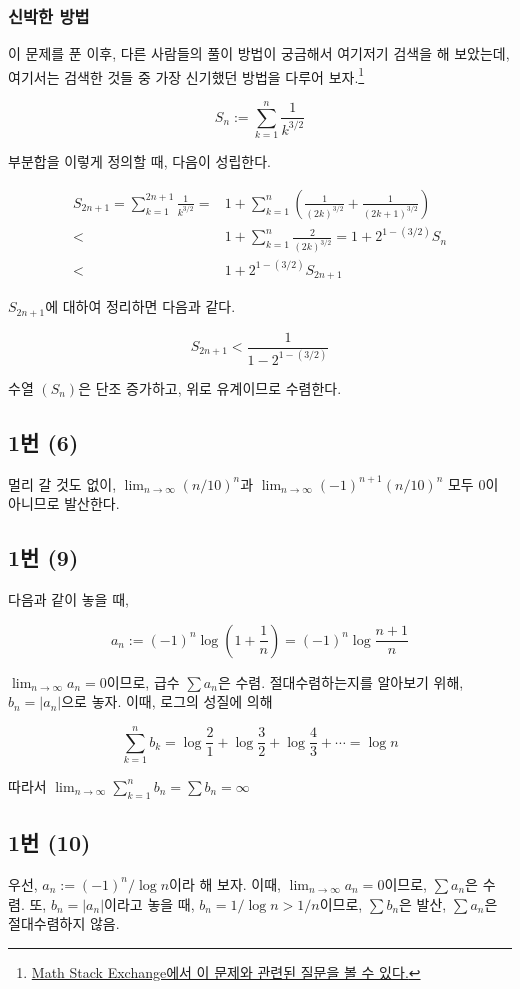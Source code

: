 \subsubsection{신박한 방법}

이 문제를 푼 이후, 다른 사람들의 풀이 방법이 궁금해서 여기저기 검색을 해 보았는데, 여기서는 검색한 것들 중 가장 신기했던 방법을 다루어 보자.\footnote{\href{https://math.stackexchange.com/questions/29450/self-contained-proof-that-sum-limits-n-1-infty-frac1np-converges-for}{Math Stack Exchange에서 이 문제와 관련된 질문을 볼 수 있다.}}

\[
S_n:=\sum^n_{k=1}\frac{1}{k^{3/2}}
\]

부분합을 이렇게 정의할 때, 다음이 성립한다.

\begin{align*}
S_{2n+1}=\sum^{2n+1}_{k=1}\frac{1}{k^{3/2}}=&1+\sum^n_{k=1}(\frac{1}{(2k)^{3/2}}+\frac{1}{(2k+1)^{3/2}})\\
<&1+\sum^n_{k=1}\frac{2}{(2k)^{3/2}}=1+2^{1-(3/2)}S_n\\
<&1+2^{1-(3/2)}S_{2n+1}
\end{align*}

$S_{2n+1}$에 대하여 정리하면 다음과 같다.

\[
S_{2n+1}<\frac{1}{1-2^{1-(3/2)}}
\]

수열 $(S_n)$은 단조 증가하고, 위로 유계이므로 수렴한다.

\subsection{1번 (6)}
멀리 갈 것도 없이, $\lim_{n\to\infty}(n/10)^n$과 $\lim_{n\to\infty}(-1)^{n+1}(n/10)^n$ 모두 0이 아니므로 발산한다.

\subsection{1번 (9)}
다음과 같이 놓을 때,

\[
a_n:=(-1)^n\log (1+\frac{1}{n})=(-1)^n\log \frac{n+1}{n}
\]

$\lim_{n\to\infty}a_n=0$이므로, 급수 $\sum a_n$은 수렴. 절대수렴하는지를 알아보기 위해, $b_n=|a_n|$으로 놓자. 이때, 로그의 성질에 의해

\[
\sum^n_{k=1} b_k=\log \frac{2}{1}+\log \frac{3}{2}+\log \frac{4}{3}+\cdots=\log n
\]

따라서 $\lim_{n\to\infty}\sum^n_{k=1}b_n=\sum b_n=\infty$

\subsection{1번 (10)}
우선, $a_n:=(-1)^n/\log n$이라 해 보자. 이때, $\lim_{n\to\infty}a_n=0$이므로, $\sum a_n$은 수렴. 또, $b_n=|a_n|$이라고 놓을 때, $b_n=1/\log n > 1/n$이므로, $\sum b_n$은 발산, $\sum a_n$은 절대수렴하지 않음.
